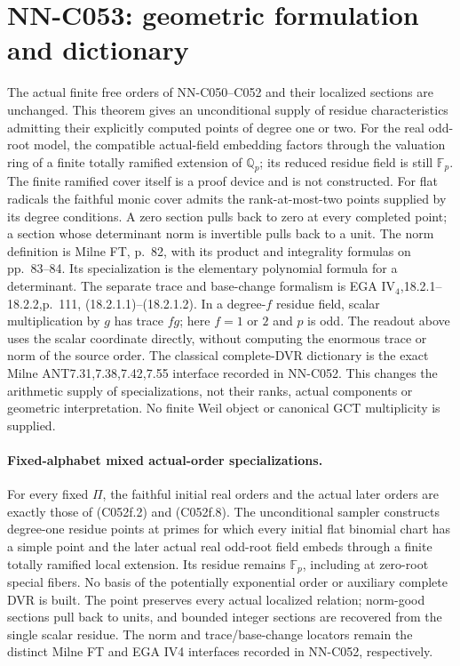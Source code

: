 \section{NN-C053: geometric formulation and dictionary}
\begin{geometricstatement}[NN-C053]
The actual finite free orders of NN-C050--C052 and their
localized sections are unchanged. This theorem gives an
unconditional supply of residue characteristics admitting
their explicitly computed points of degree one or two.
For the real odd-root model, the compatible actual-field
embedding factors through the valuation ring of a finite
totally ramified extension of $\mathbb Q_p$; its reduced
residue field is still $\mathbb F_p$. The finite ramified
cover itself is a proof device and is not constructed.
For flat radicals the faithful monic cover admits the
rank-at-most-two points supplied by its degree conditions.
A zero section pulls back to zero at every completed point;
a section whose determinant norm is invertible pulls back
to a unit. The norm definition is Milne FT, p.~82, with
its product and integrality formulas on pp.~83--84.
Its specialization is the elementary polynomial formula
for a determinant. The separate trace and base-change
formalism is EGA IV$_4$,18.2.1--18.2.2,p.~111,
(18.2.1.1)--(18.2.1.2). In a degree-$f$ residue field,
scalar multiplication by $g$ has trace $fg$; here $f=1$
or $2$ and $p$ is odd. The readout above uses the scalar
coordinate directly, without computing the enormous
trace or norm of the source order.
The classical complete-DVR dictionary is the exact
Milne ANT7.31,7.38,7.42,7.55 interface recorded in NN-C052.
This changes the arithmetic supply of specializations,
not their ranks, actual components or geometric interpretation.
No finite Weil object or canonical GCT multiplicity is supplied.

\paragraph{Fixed-alphabet mixed actual-order specializations.}
For every fixed \(\Pi\), the faithful initial real
orders and the actual later orders are exactly those
of (C052f.2) and (C052f.8). The unconditional sampler
constructs degree-one residue points at primes for
which every initial flat binomial chart has a simple
point and the later actual real odd-root field embeds
through a finite totally ramified local extension.
Its residue remains \(\mathbb F_p\), including at
zero-root special fibers. No basis of the potentially
exponential order or auxiliary complete DVR is built.
The point preserves every actual localized relation;
norm-good sections pull back to units, and bounded
integer sections are recovered from the single scalar
residue. The norm and trace/base-change locators remain
the distinct Milne FT and EGA IV4 interfaces recorded
in NN-C052, respectively.


\end{geometricstatement}
